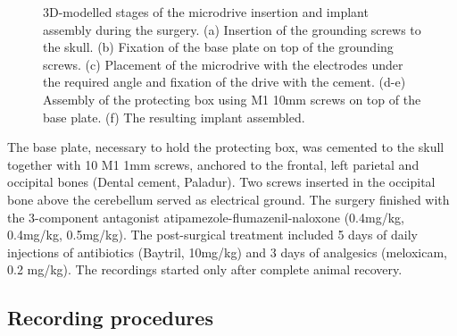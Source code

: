 \begin{figure}
\captionsetup{format=plain}
\caption[Surgery]{
3D-modelled stages of the microdrive insertion and implant assembly during the surgery. (a) Insertion of the grounding screws to the skull. (b) Fixation of the base plate on top of the grounding screws. (c) Placement of the microdrive with the electrodes under the required angle and fixation of the drive with the cement. (d-e) Assembly of the protecting box using M1 10mm screws on top of the base plate. (f) The resulting implant assembled.
}
\label{fig:F31_surgery}
\end{figure}

The base plate, necessary to hold the protecting box, was cemented to the skull together with 10 M1 1mm screws, anchored to the frontal, left parietal and occipital bones (Dental cement, Paladur). Two screws inserted in the occipital bone above the cerebellum served as electrical ground. The surgery finished with the 3-component antagonist atipamezole-flumazenil-naloxone (0.4mg/kg, 0.4mg/kg, 0.5mg/kg). The post-surgical treatment included 5 days of daily injections of antibiotics (Baytril, 10mg/kg) and 3 days of analgesics (meloxicam, 0.2 mg/kg). The recordings started only after complete animal recovery.


\subsection{Recording procedures}

